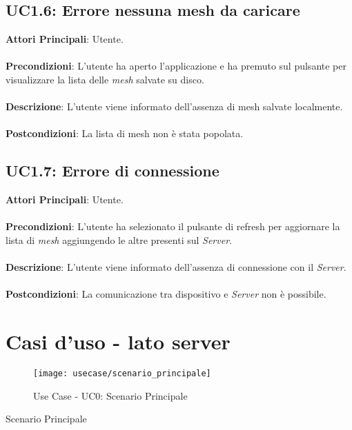 \subsection{UC1.6: Errore nessuna mesh da caricare}
\textbf{Attori Principali}: Utente.
\\\\ \textbf{Precondizioni}: L'utente ha aperto l'applicazione e ha premuto sul pulsante per visualizzare la lista delle \emph{mesh} salvate su disco.
\\\\ \textbf{Descrizione}: L'utente viene informato dell'assenza di mesh salvate localmente.
\\\\ \textbf{Postcondizioni}: La lista di mesh non è stata popolata.

\subsection{UC1.7: Errore di connessione}
\textbf{Attori Principali}: Utente.
\\\\ \textbf{Precondizioni}: L'utente ha selezionato il pulsante di refresh per aggiornare la lista di \emph{mesh} aggiungendo le altre presenti sul \emph{Server}.
\\\\ \textbf{Descrizione}: L'utente viene informato dell'assenza di connessione con il \emph{Server}.
\\\\ \textbf{Postcondizioni}: La comunicazione tra dispositivo e \emph{Server} non è possibile.



\section{Casi d'uso - lato server}
\begin{figure}[!h] 
    \centering 
    \texttt{[image: usecase/scenario\_principale]} 
    \caption{Use Case - UC0: Scenario Principale}
\end{figure}

\begin{usecase}{0}{Scenario Principale}
\\ 
\\ 
\\ 
\label{uc:scenario_principale}
\end{usecase}

